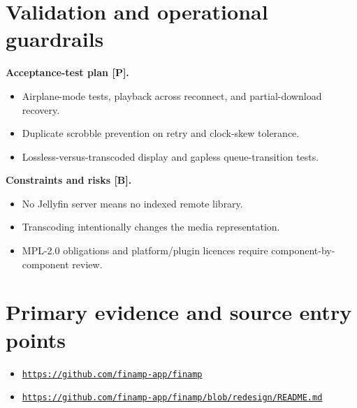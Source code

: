 \documentclass[10pt,a4paper,oneside]{report}
\newcommand{\sourceurl}[1]{\href{#1}{\texttt{\nolinkurl{#1}}}}
\begin{document}
\section{Validation and operational guardrails}
\textbf{Acceptance-test plan [P].}\par
\begin{itemize}[leftmargin=*,itemsep=2pt,topsep=3pt]
\item Airplane-mode tests, playback across reconnect, and partial-download recovery.
\item Duplicate scrobble prevention on retry and clock-skew tolerance.
\item Lossless-versus-transcoded display and gapless queue-transition tests.
\end{itemize}
\textbf{Constraints and risks [B].}\par
\begin{itemize}[leftmargin=*,itemsep=2pt,topsep=3pt]
\item No Jellyfin server means no indexed remote library.
\item Transcoding intentionally changes the media representation.
\item MPL-2.0 obligations and platform/plugin licences require component-by-component review.
\end{itemize}
\section*{Primary evidence and source entry points}
\begin{itemize}[leftmargin=*,itemsep=1pt,topsep=1pt]
\item \sourceurl{https://github.com/finamp-app/finamp}
\item \sourceurl{https://github.com/finamp-app/finamp/blob/redesign/README.md}
\end{itemize}
\clearpage
\end{document}
